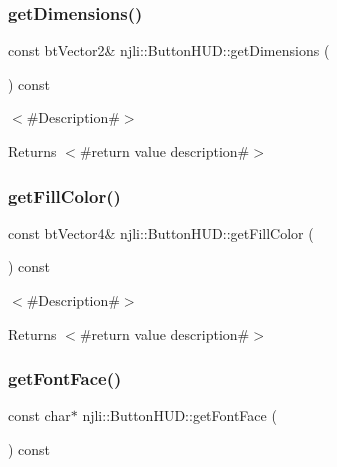 \subsubsection{\texorpdfstring{get\+Dimensions()}{getDimensions()}}
{\footnotesize\ttfamily const bt\+Vector2\& njli\+::\+Button\+H\+U\+D\+::get\+Dimensions (\begin{DoxyParamCaption}{ }\end{DoxyParamCaption}) const}

$<$\#\+Description\#$>$

\begin{DoxyReturn}{Returns}
$<$\#return value description\#$>$ 
\end{DoxyReturn}
\mbox{\label{classnjli_1_1_button_h_u_d_a2b5873b247fac1bd17ff2729a372f4b7}} 
\subsubsection{\texorpdfstring{get\+Fill\+Color()}{getFillColor()}}
{\footnotesize\ttfamily const bt\+Vector4\& njli\+::\+Button\+H\+U\+D\+::get\+Fill\+Color (\begin{DoxyParamCaption}{ }\end{DoxyParamCaption}) const}

$<$\#\+Description\#$>$

\begin{DoxyReturn}{Returns}
$<$\#return value description\#$>$ 
\end{DoxyReturn}
\mbox{\label{classnjli_1_1_button_h_u_d_a83f04cb866e1b369fd0b93605b1237a5}} 
\subsubsection{\texorpdfstring{get\+Font\+Face()}{getFontFace()}}
{\footnotesize\ttfamily const char$\ast$ njli\+::\+Button\+H\+U\+D\+::get\+Font\+Face (\begin{DoxyParamCaption}{ }\end{DoxyParamCaption}) const}

